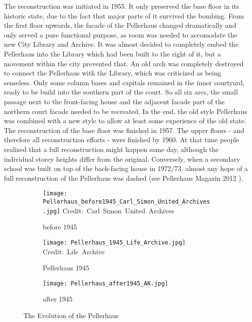 The reconstruction was initiated in 1955. It only preserved the base floor in its historic state, due to the fact that major parts of it survived the bombing. From the first floor upwards, the facade of the Pellerhaus changed dramatically and only served a pure functional purpose, as room was needed to accomodate the new City Library and Archive. It was almost decided to completely embed the Pellerhaus into the Library which had been built to the right of it, but a movement within the city prevented that. An old arch was completely destroyed to connect the Pellerhaus with the Library, which was criticized as being senseless. Only some column bases and capitals remained in the inner courtyard, ready to be build into the southern part of the court. So all six arcs, the small passage next to the front-facing house and the adjacent facade part of the northern court facade needed to be recreated. In the end, the old style Pellerhaus was combined with a new style to allow at least some experience of the old state. The reconstruction of the base floor was finished in 1957. The upper floors - and therefore all reconstruction efforts - were finished by 1960. At that time people realized that a full reconstruction might happen some day, although the individual storey heights differ from the original. Conversely, when a secondary school was built on top of the back-facing house in 1972/73, almost any hope of a full reconstruction of the Pellerhaus was dashed (see Pellerhaus Magazin 2012 \parencite{afPellerhausMagazin01}). \\


\begin{figure}[h]
	\centering
	\begin{subfigure}[b]{0.3\textwidth}
		\centering
		\texttt{[image: Pellerhaus\_before1945\_Carl\_Simon\_United\_Archives.jpg]}
		\hbox{\scriptsize Credit: Carl Simon United Archives}
		\caption{before 1945}
		\label{fig:pellerhaus_historic}
	\end{subfigure}
	\hfill
	\begin{subfigure}[b]{0.3\textwidth}
		\centering
		\texttt{[image: Pellerhaus\_1945\_Life\_Archive.jpg]}
		\hbox{\scriptsize Credit: Life Archive}
		\caption{Pellerhaus 1945}
		\label{fig:pellerhaus_destructed}
	\end{subfigure}
	\hfill
	\begin{subfigure}[b]{0.3\textwidth}
		\centering
		\texttt{[image: Pellerhaus\_after1945\_AK.jpg]}
		\hbox{\scriptsize }
		\caption{after 1945}
		\label{fig:pellerhaus_modern}
	\end{subfigure}
	\caption{The Evolution of the Pellerhaus}
	\label{fig:pellerhaus_states}
\end{figure}

